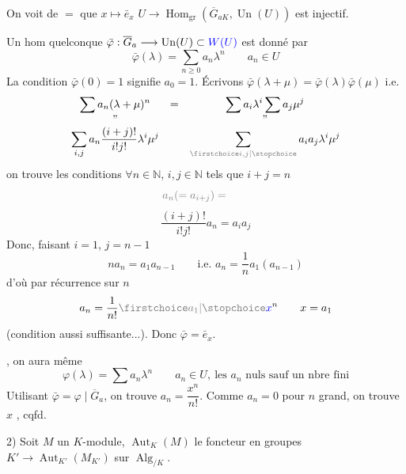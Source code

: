 On voit de $=$ que $x\longmapsto\bar e_x$ $U\longrightarrow\operatorname{Hom}_{\mathrm{gr}}(\overline G_{aK},\operatorname{Un}(U))$ est injectif.

Un hom quelconque  $\bar\varphi:\overline G_a\longrightarrow\operatorname{Un}(U)\subset{\color{blue}W(U)}$ est donné par
\[
\bar\varphi(\lambda)=\sum_{n\geq0}a_n\lambda^n\qquad a_n\in U
\]
La condition $\bar\varphi(0)=1$ signifie $a_0=1$. Écrivons $\bar\varphi(\lambda+\mu)=\bar\varphi(\lambda)\bar\varphi(\mu)$ i.e.
\[
\begin{array}{ccc}
\displaystyle\sum a_n(\lambda+\mu)^n&=&\displaystyle\sum a_i\lambda^i\sum a_j\mu^j\\
\text{''}&&\text{''}\\
\displaystyle\sum_{i,j}a_n\frac{(i+j)!}{i!j!}\lambda^i\mu^j&&\displaystyle\sum_{\deleted{\unsure{i,j}}}a_i a_j\lambda^i\mu^j
\end{array}
\]
on trouve les conditions $\forall n\in\mathbb{N}$, $i,j\in\mathbb{N}$ tels que $i+j=n$
\[
\deleted{a_n(=a_{i+j})=}\qquad
\]
\[
\frac{(i+j)!}{i!j!}a_n=a_i a_j
\]
Donc, faisant $i=1$, $j=n-1$
\[
na_n=a_1a_{n-1}\qquad\text{i.e. }a_n=\frac1n a_1(a_{n-1})
\]
d'où par récurrence sur $n$
\[
a_n=\frac1{n!}\deleted{\unsure{a_1}}\inserted{x}^{n}\qquad x=a_1
\]
(condition aussi suffisante...). Donc $\bar\varphi=\bar e_x$.

, on aura même
\[
\varphi(\lambda)=\sum a_n\lambda^n\qquad a_n\in U,\ \text{les }a_n\text{ nuls sauf un nbre fini}
\]
Utilisant $\bar\varphi=\varphi\mid\overline G_a$, on trouve $a_n=\dfrac{x^n}{n!}$. Comme $a_n=0$ pour $n$ grand, on trouve $x$ , cqfd.

2) Soit $M$ un $K$-module, $\operatorname{Aut}_K(M)$  le foncteur en groupes $K'\longrightarrow\operatorname{Aut}_{K'}(M_{K'})$ sur $\operatorname{Alg}_{/K}$.

